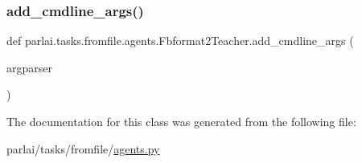 \subsubsection{\texorpdfstring{add\+\_\+cmdline\+\_\+args()}{add\_cmdline\_args()}}
{\footnotesize\ttfamily def parlai.\+tasks.\+fromfile.\+agents.\+Fbformat2\+Teacher.\+add\+\_\+cmdline\+\_\+args (\begin{DoxyParamCaption}\item[{}]{argparser }\end{DoxyParamCaption})\hspace{0.3cm}{\ttfamily [static]}}



The documentation for this class was generated from the following file\+:\begin{DoxyCompactItemize}
\item 
parlai/tasks/fromfile/\hyperlink{parlai_2tasks_2fromfile_2agents_8py}{agents.\+py}\end{DoxyCompactItemize}
